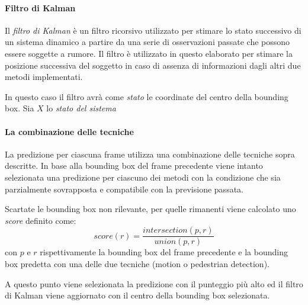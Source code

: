 \paragraph{Filtro di Kalman}

Il \emph{filtro di Kalman} è un filtro ricorsivo utilizzato per stimare lo stato successivo di un sistema dinamico a partire da una serie di osservazioni passate che possono essere soggette a rumore. Il filtro è utilizzato in questo elaborato per stimare la posizione successiva del soggetto in caso di assenza di informazioni dagli altri due metodi implementati.

In questo caso il filtro avrà come \emph{stato} le coordinate del centro della bounding box.
Sia $X$ lo \emph{stato del sistema}

\paragraph{La combinazione delle tecniche}

La predizione per ciascuna frame utilizza una combinazione delle tecniche sopra descritte. In base alla bounding box del frame precedente viene intanto selezionata una predizione per ciascuno dei metodi con la condizione che sia parzialmente sovrapposta e compatibile con la previsione passata.

Scartate le bounding box non rilevante, per quelle rimanenti viene calcolato uno \emph{score} definito come:
\begin{equation}
score(r) = \frac{intersection(p, r)}{union(p, r)}
\end{equation}
con $p$ e $r$ rispettivamente la bounding box del frame precedente e la bounding box predetta con una delle due tecniche (motion o pedestrian detection).

A questo punto viene selezionata la predizione con il punteggio più alto ed il filtro di Kalman viene aggiornato con il centro della bounding box selezionata. 

